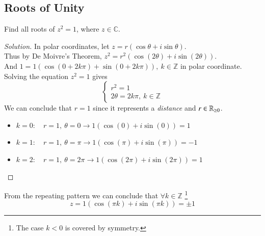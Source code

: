 \documentclass[10pt]{article}
\begin{document}
		\subsection{Roots of Unity}
		\begin{example}
			Find all roots of $z^2 = 1$, where $z \in \mathbb{C}$. 
			\begin{proof}[Solution]
				In polar coordinates, let $z = r (\cos \theta + i \sin \theta)$. \\
				Thus by De Moivre's Theorem, $z^2 = r^2 (\cos (2\theta) + i \sin(2\theta))$. \\
				And $1 = 1 (\cos(0+2k\pi) + \sin(0+2k\pi)),\ k \in \mathbb{Z}$ in polar coordinate. \\
				Solving the equation $z^2 = 1$ gives \\
				\[
					\begin{cases}
						r^2 = 1 \\
						2\theta = 2k\pi,\ k \in \mathbb{Z}
					\end{cases}
				\]
				We can conclude that $r=1$ since it represents a \emph{distance} and $r \in \mathbb{R}_{\geq 0}$. \\
				\begin{itemize}
					\item $k=0:\quad r=1,\ \theta = 0 \rightarrow 1(\cos(0) + i \sin(0)) = 1$ 
					\item $k=1:\quad r=1,\ \theta = \pi \rightarrow 1(\cos(\pi) + i \sin(\pi)) = -1$ 
					\item $k=2:\quad r=1,\ \theta = 2\pi \rightarrow 1(\cos(2\pi) + i \sin(2\pi)) = 1$
				\end{itemize}
			\end{proof}
			From the repeating pattern we can conclude that $\forall k \in \mathbb{Z}$ \footnote{The case $k<0$ is covered by symmetry.} \[z = 1 (\cos(\pi k) + i \sin(\pi k)) = \pm 1\]
		\end{example}
		
\end{document}
